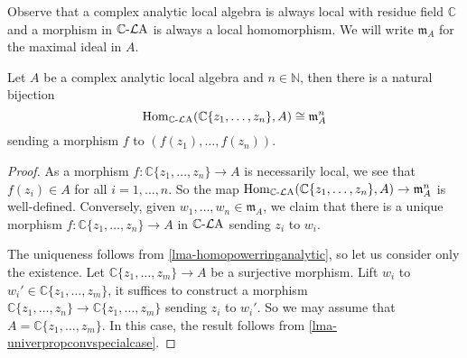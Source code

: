 Observe that a complex analytic local algebra is always local with residue field $\mathbb{C}$ and a morphism in $\mathbb{C}\text{-}\mathcal{L}\mathrm{A}$ is always a local homomorphism. We will write $\mathfrak{m}_A$ for the maximal ideal in $A$.

\begin{lemma}\label{lma-powerseriesfunctorpoint}
    Let $A$ be a complex analytic local algebra and $n\in \mathbb{N}$, then there is a natural bijection
    \[
        \operatorname{Hom}_{\mathbb{C}\text{-}\mathcal{L}\mathrm{A}}(\mathbb{C}\{ z_1,\ldots,z_n \},A)\cong \mathfrak{m}_{A}^n
    \]
    sending a morphism $f$ to $(f(z_1),\ldots,f(z_n))$.
\end{lemma}
\begin{proof}
    As a morphism $f:\mathbb{C}\{ z_1,\ldots,z_n \} \rightarrow A$ is necessarily local, we see that $f(z_i)\in A$ for all $i=1,\ldots,n$. So the map $\operatorname{Hom}_{\mathbb{C}\text{-}\mathcal{L}\mathrm{A}}(\mathbb{C}\{ z_1,\ldots,z_n \},A)\rightarrow \mathfrak{m}_{A}^n$ is well-defined. Conversely, given $w_1,\ldots,w_n\in \mathfrak{m}_A$, we claim that there is a unique morphism $f:\mathbb{C}\{ z_1,\ldots,z_n \} \rightarrow A$ in $\mathbb{C}\text{-}\mathcal{L}\mathrm{A}$ sending $z_i$ to $w_i$.

    The uniqueness follows from \cref{lma-homopowerringanalytic}, so let us consider only the existence.
    Let $\mathbb{C}\{ z_1,\ldots,z_m \} \rightarrow A$ be a surjective morphism. Lift $w_i$ to $w_i'\in \mathbb{C}\{ z_1,\ldots,z_m \}$, it suffices to construct a morphism $\mathbb{C}\{ z_1,\ldots,z_n \}\rightarrow \mathbb{C}\{ z_1,\ldots,z_m \}$ sending $z_i$ to $w_i'$. So we may assume that $A=\mathbb{C}\{ z_1,\ldots,z_m \}$. In this case, the result follows from \cref{lma-univerpropconvspecialcase}.
\end{proof}

